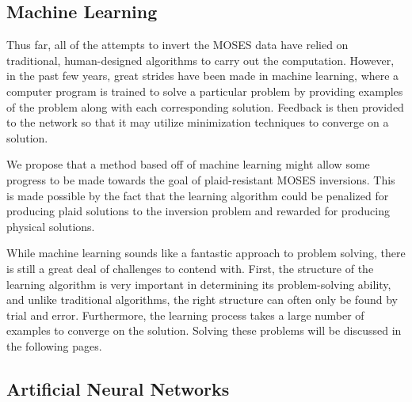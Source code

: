 \documentclass[twoside]{article}
\begin{document}
\begin{multicols}{2}
\subsection{Machine Learning}
Thus far, all of the attempts to invert the MOSES data have relied on traditional, human-designed algorithms to carry out the computation. However, in the past few years, great strides have been made in machine learning, where a computer program is trained to solve a particular problem by providing examples of the problem along with each corresponding solution. Feedback is then provided to the network so that it may utilize minimization techniques to converge on a solution. \par We propose that a method based off of machine learning might allow some progress to be made towards the goal of plaid-resistant MOSES inversions. This is made possible by the fact that the learning algorithm could be penalized for producing plaid solutions to the inversion problem and rewarded for producing physical solutions.  \par While machine learning sounds like a fantastic approach to problem solving, there is still a great deal of challenges to contend with. First, the structure of the learning algorithm is very important in determining its problem-solving ability, and unlike traditional algorithms, the right structure can often only be found by trial and error. Furthermore, the learning process takes a large number of examples to converge on the solution. Solving these problems will be discussed in the following pages.

\subsection{Artificial Neural Networks}


\end{multicols}
\end{document}
